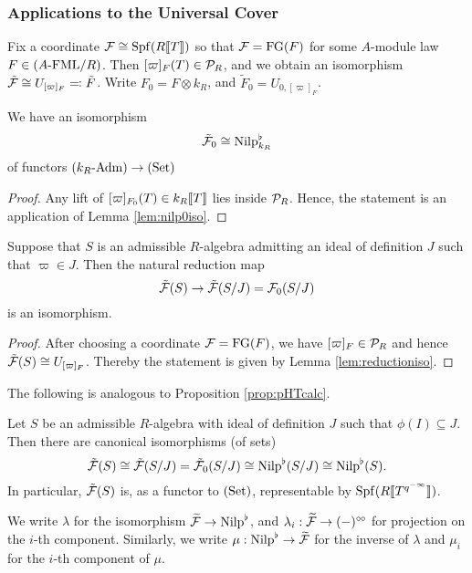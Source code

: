 \documentclass[../main.tex]{subfiles}
\begin{document}
\subsubsection{Applications to the Universal Cover} %
\label{ssub:The Universal Cover}

Fix a coordinate $\mathcal{F} \cong \operatorname{Spf}(R\llbracket T \rrbracket)$ so that $\mathcal{F} = \textnormal{FG}(F)$ for
some $A$-module law $F \in {({A}\text-\allowbreak\mathrm{FML}/{R})}$. Then $[\varpi]_F(T) \in \mathcal{P}_R$, and
we obtain an isomorphism $\tilde {\mathcal{F}} \cong U_{[\varpi]_F} \eqqcolon \tilde F$.
Write $F_0 = F \otimes k_R$, and $\tilde F_0 = U_{0, [\varpi]_F}$. 

\begin{lem}
  We have an isomorphism 
  \begin{equation*}
    \tilde {\mathcal{F}}_0 \cong {\mathrm{Nilp}}^\flat_{k_R}
  \end{equation*}
  of functors ${({k_R}\text-\allowbreak\mathrm{Adm})} \to {(\mathrm{Set})}$
  \begin{proof}
    Any lift of $[\varpi]_{F_0}(T) \in k_R\llbracket T \rrbracket$ lies inside $\mathcal{P}_R$. Hence,
    the statement is an application of Lemma \ref{lem:nilp0iso}.
  \end{proof}
\end{lem}

\begin{lem}
  Suppose that $S$ is an admissible $R$-algebra admitting an ideal of definition
  $J$ such that $\varpi \in J$. Then the natural reduction map
  \begin{equation*}
    \tilde {\mathcal{F}}(S) \to \tilde {\mathcal{F}}(S/J) = \mathcal{F}_0(S/J)
  \end{equation*}
  is an isomorphism.
  \begin{proof}[Proof]
    After choosing a coordinate $\mathcal{F} = \textnormal{FG}(F)$, we have $[\varpi]_F \in \mathcal{P}_R$
    and hence $\tilde {\mathcal{F}}(S) \cong U_{[\varpi]_F}$. Thereby the statement is
    given by Lemma \ref{lem:reductioniso}.
  \end{proof}
\end{lem}

The following is analogous to Proposition \ref{prop:pHTcalc}.
\begin{prop}\label{prop:UnivCoverReductionIso}
  Let $S$ be an admissible $R$-algebra with ideal of definition $J$ such that 
  $\phi(I) \subseteq J$. Then there are canonical isomorphisms (of sets)
  \begin{equation*}
    \tilde {\mathcal{F}}(S) \cong \tilde {\mathcal{F}}(S/J) = \tilde {\mathcal{F}}_0(S/J) \cong {\mathrm{Nilp}}^\flat(S/J) \cong
    {\mathrm{Nilp}}^\flat(S).
  \end{equation*}
  In particular, $\tilde {\mathcal{F}}(S)$ is, as a functor to ${(\mathrm{Set})}$, representable by
  $\operatorname{Spf}(R \llbracket T^{q^{-\infty}} \rrbracket)$.
\end{prop}
We write $\lambda$ for the isomorphism $\widetilde{\mathcal{F}} \to {\mathrm{Nilp}}^\flat$, and
$\lambda_i: \widetilde{\mathcal{F}} \to (-)^{\circ \hspace{-0.5pt} \circ}$ for projection on the $i$-th component.
Similarly, we write $\mu: {\mathrm{Nilp}}^\flat \to \widetilde{\mathcal{F}}$ for the inverse of 
$\lambda$ and $\mu_i$ for the $i$-th component of $\mu$. 
\end{document}
